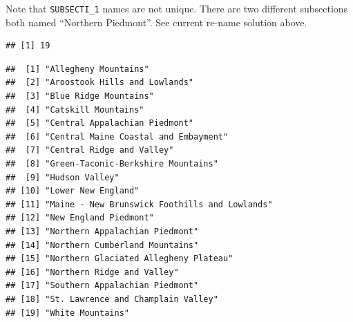 \documentclass[
]{book}
\newenvironment{Shaded}{\begin{snugshade}}{\end{snugshade}}
\newcommand{\DocumentationTok}[1]{\textcolor[rgb]{0.56,0.35,0.01}{\textbf{\textit{#1}}}}
\newcommand{\FunctionTok}[1]{\textcolor[rgb]{0.13,0.29,0.53}{\textbf{#1}}}
\newcommand{\NormalTok}[1]{#1}
\newcommand{\SpecialCharTok}[1]{\textcolor[rgb]{0.81,0.36,0.00}{\textbf{#1}}}
\begin{document}
Note that \texttt{SUBSECTI\_1} names are not unique. There are two different subsections both named ``Northern Piedmont''. See current re-name solution above.

\begin{Shaded}
\end{Shaded}

\begin{verbatim}
## [1] 19
\end{verbatim}

\begin{Shaded}
\end{Shaded}

\begin{verbatim}
##  [1] "Allegheny Mountains"                         
##  [2] "Aroostook Hills and Lowlands"                
##  [3] "Blue Ridge Mountains"                        
##  [4] "Catskill Mountains"                          
##  [5] "Central Appalachian Piedmont"                
##  [6] "Central Maine Coastal and Embayment"         
##  [7] "Central Ridge and Valley"                    
##  [8] "Green-Taconic-Berkshire Mountains"           
##  [9] "Hudson Valley"                               
## [10] "Lower New England"                           
## [11] "Maine - New Brunswick Foothills and Lowlands"
## [12] "New England Piedmont"                        
## [13] "Northern Appalachian Piedmont"               
## [14] "Northern Cumberland Mountains"               
## [15] "Northern Glaciated Allegheny Plateau"        
## [16] "Northern Ridge and Valley"                   
## [17] "Southern Appalachian Piedmont"               
## [18] "St. Lawrence and Champlain Valley"           
## [19] "White Mountains"
\end{verbatim}

\begin{Shaded}
\end{Shaded}
\end{document}
